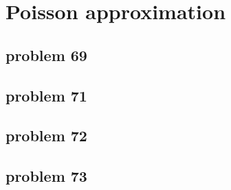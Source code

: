 \section{Poisson approximation}

\subsection{problem 69}


\subsection{problem 71}


\subsection{problem 72}


\subsection{problem 73}

